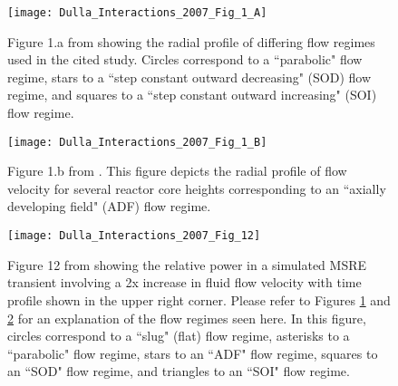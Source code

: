 \documentclass[review]{elsarticle}
\begin{document}
\begin{figure}[H]
   \centering
   \texttt{[image: Dulla\_Interactions\_2007\_Fig\_1\_A]}
   \caption{Figure 1.a from \cite{dulla_interactions_2007} showing the radial profile of
   differing flow regimes used in the cited study. Circles correspond
    to a ``parabolic" flow regime, stars to a ``step constant outward
     decreasing"
    (SOD) flow regime, and squares to a ``step constant outward increasing"
     (SOI)
    flow regime.} 
   \label{fig:dulla_flow_map}
\end{figure}

\begin{figure}[H]
   \centering
   \texttt{[image: Dulla\_Interactions\_2007\_Fig\_1\_B]}
   \caption{Figure 1.b from \cite{dulla_interactions_2007}.
   This figure depicts
   the radial profile of flow velocity for several reactor core heights
   corresponding to an ``axially developing field" (ADF) flow regime.} 
   \label{fig:dulla_flow_adf}
\end{figure}

\begin{figure}[H]
   \centering
   \texttt{[image: Dulla\_Interactions\_2007\_Fig\_12]}
   \caption{Figure 12 from \cite{dulla_interactions_2007} showing the relative power in a
   simulated MSRE transient involving a 2x increase in fluid flow velocity with time profile
   shown in the upper right corner. Please refer to
   Figures \ref{fig:dulla_flow_map} and \ref{fig:dulla_flow_adf} for an
   explanation of the flow regimes seen here. In this figure, circles correspond
   to a ``slug" (flat) flow regime, asterisks to a ``parabolic" flow regime,
   stars to an
   ``ADF" flow regime, squares to an ``SOD" flow regime, and triangles to an
   ``SOI" flow regime.} 
   \label{fig:dulla_flow_regimes}
\end{figure}
\end{document}
